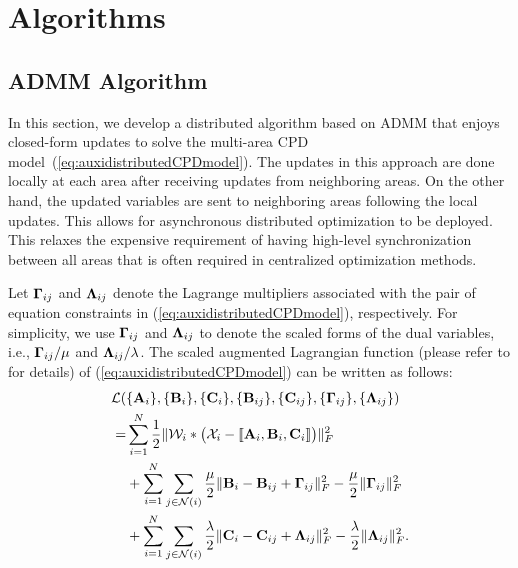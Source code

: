 \documentclass[journal]{IEEEtran}
\newcounter{thm}
\newcommand{\cpd}[3]{\llbracket #1, #2, #3 \rrbracket}
\newcommand{\A}{{\bf A}}
\newcommand{\B}{{\bf B}}
\newcommand{\C}{{\bf C}}
\newcommand{\Ten}[1]{\mathcal{#1}}
\newcommand{\revision}[1]{{\color{black} #1}} %
\begin{document}
\section{Algorithms}
\label{sec:algorithms}
\subsection{ADMM Algorithm}
\label{section:disADMM}
In this section, we develop a distributed algorithm based on ADMM that enjoys closed-form updates to solve the multi-area CPD model~(\ref{eq:auxidistributedCPDmodel}). \revision{The updates in this approach are done locally at each area after receiving updates from neighboring areas. On the other hand, the updated variables are sent to neighboring areas following the local updates. This allows for asynchronous distributed optimization to be deployed. This relaxes the expensive requirement of having high-level synchronization between all areas that is often required in centralized optimization methods.}

Let ${\bf{\Gamma}}_{ij}$ and ${\bf{\Lambda}}_{ij}$ denote the Lagrange multipliers associated with the pair of equation constraints in (\ref{eq:auxidistributedCPDmodel}), respectively.
For simplicity, we use ${\bf{\Gamma}}_{ij}$ and ${\bf{\Lambda}}_{ij}$ to denote the scaled forms of the dual variables, i.e., ${\bf{\Gamma}}_{ij}/\mu$ and ${\bf{\Lambda}}_{ij}/\lambda$.  
The scaled augmented Lagrangian function (please refer to \cite{Boyd_admm} for details) of (\ref{eq:auxidistributedCPDmodel}) can be written as follows:
\begin{equation}
     \label{eq:augmentedlagrangianfunc}
     \begin{aligned}
    \mathcal{L}(&\{\A_i\}, \{\B_i\}, \{\C_i\}, \{\B_{ij}\}, \{\C_{ij}\}, \{{\bf{\Gamma}}_{ij}\}, \{{\bf{\Lambda}}_{ij}\})\\
     \ = &\sum_{i=1}^N\frac{1}{2}\| \Ten{W}_i * \big(\Ten{X}_i - {\cpd{\A_i}{\B_i}{\C_i}} \big)\|_F^2\\
    &+\sum_{i=1}^N\sum_{j\in\mathcal{N}(i)}\frac{\mu}{2}\|\B_{i}-\B_{ij}+{\bf{\Gamma}}_{ij}\|_F^2-\frac{\mu}{2}\|{\bf{\Gamma}}_{ij}\|_F^2\\
    &+\sum_{i=1}^N\sum_{j\in\mathcal{N}(i)}\frac{\lambda}{2}\|\C_{i}-\C_{ij}+{\bf{\Lambda}}_{ij}\|_F^2-\frac{\lambda}{2}\|{\bf{\Lambda}}_{ij}\|_F^2.
    \end{aligned}
 \end{equation}
\end{document}
